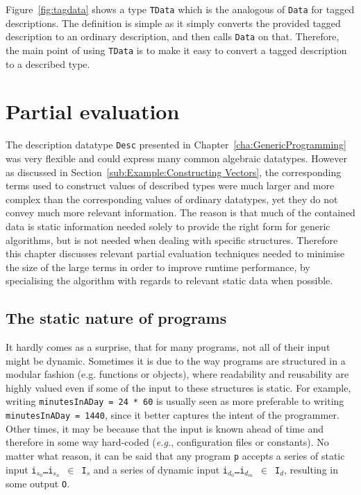 \documentclass{ituthesis}
\newcommand{\tttype}[1]{\textcolor{type-color}{\texttt{#1}}}
\newcommand{\ttdec}[1]{\textcolor{declared-var-color}{\texttt{#1}}}
\newcommand{\ttvar}[1]{\textcolor{local-var-color}{\texttt{#1}}}
\newcommand{\ttliteral}[1]{\textcolor{literal-color}{\texttt{#1}}}
\theoremstyle{break}
\begin{document}
Figure~\ref{fig:tagdata} shows a type \ttdec{TData} which is the analogous of \tttype{Data} for tagged descriptions.
The definition is simple as it simply converts the provided tagged description to an ordinary description, and then calls \tttype{Data} on that.
Therefore, the main point of using \ttdec{TData} is to make it easy to convert a tagged description to a described type.



\chapter{Partial evaluation}
\label{cha:PartialEvaluation}

The description datatype \tttype{Desc} presented in Chapter~\ref{cha:GenericProgramming} was very flexible and could express many common algebraic datatypes.
However as discussed in Section~\ref{sub:Example:Constructing Vectors}, the corresponding terms used to construct values of described types were much larger and more complex than the corresponding values of ordinary datatypes, yet they do not convey much more relevant information.
The reason is that much of the contained data is static information needed solely to provide the right form for generic algorithms, but is not needed when dealing with specific structures.
Therefore this chapter discusses relevant partial evaluation techniques needed to minimise the size of the large terms in order to improve runtime performance, by specialising the algorithm with regards to relevant static data when possible.

\section{The static nature of programs}
\label{sec:Thestaticnatureofprograms}
It hardly comes as a surprise, that for many programs, not all of their input might be dynamic.
Sometimes it is due to the way programs are structured in a modular fashion (e.g. functions or objects), where readability and reusability are highly valued even if some of the input to these structures is static.
For example, writing \ttdec{minutesInADay}~\texttt{=}~\ttliteral{24}~\texttt{*}~\ttliteral{60} is usually seen as more preferable to writing \ttdec{minutesInADay}~\texttt{=}~\ttliteral{1440}, since
it better captures the intent of the programmer.
Other times, it may be because that the input is known ahead of time and therefore in some way hard-coded (\textit{e.g.}, configuration files or constants).
No matter what reason, it can be said that any program \ttdec{p} accepts a series of static input \ttvar{i$_{s_0}$}\texttt{\ldots}\ttvar{i$_{s_n}$}~\texttt{$\in$}~\ttvar{I$_{s}$} and a series of dynamic input \ttvar{i$_{d_0}$}\texttt{\ldots}\ttvar{i$_{d_m}$}~\texttt{$\in$}~\ttvar{I$_{d}$}, resulting in some output \ttvar{O}.
\end{document}

